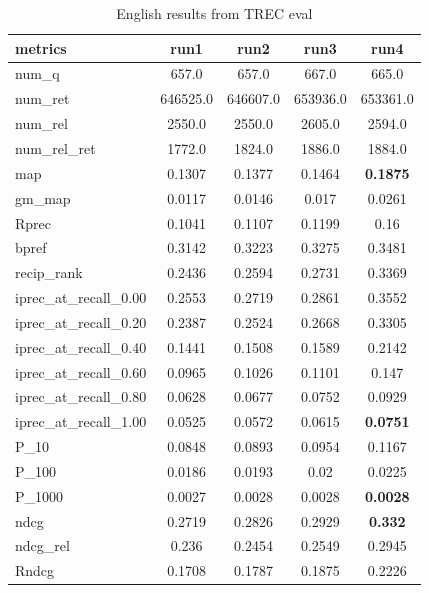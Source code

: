 
\begin{table}[h!]
    \centering
    \begin{tabular}{ |l|c|c|c|c| } 
        \hline
        metrics & run1 & run2 & run3 & run4 \\ \hline
        num\_q & 657.0 & 657.0 & 667.0 & 665.0 \\ \hline
        num\_ret & 646525.0 & 646607.0 & 653936.0 & 653361.0 \\ \hline
        num\_rel & 2550.0 & 2550.0 & 2605.0 & 2594.0 \\ \hline
        num\_rel\_ret & 1772.0 & 1824.0 & 1886.0 & 1884.0 \\ \hline
        map & 0.1307 & 0.1377 & 0.1464 & \textbf{0.1875} \\ \hline
        gm\_map & 0.0117 & 0.0146 & 0.017 & 0.0261 \\ \hline
        Rprec & 0.1041 & 0.1107 & 0.1199 & 0.16 \\ \hline
        bpref & 0.3142 & 0.3223 & 0.3275 & 0.3481 \\ \hline
        recip\_rank & 0.2436 & 0.2594 & 0.2731 & 0.3369 \\ \hline
        iprec\_at\_recall\_0.00 & 0.2553 & 0.2719 & 0.2861 & 0.3552 \\ \hline
        iprec\_at\_recall\_0.20 & 0.2387 & 0.2524 & 0.2668 & 0.3305 \\ \hline
        iprec\_at\_recall\_0.40 & 0.1441 & 0.1508 & 0.1589 & 0.2142 \\ \hline
        iprec\_at\_recall\_0.60 & 0.0965 & 0.1026 & 0.1101 & 0.147 \\ \hline
        iprec\_at\_recall\_0.80 & 0.0628 & 0.0677 & 0.0752 & 0.0929 \\ \hline
        iprec\_at\_recall\_1.00 & 0.0525 & 0.0572 & 0.0615 & \textbf{0.0751} \\ \hline
        P\_10 & 0.0848 & 0.0893 & 0.0954 & 0.1167 \\ \hline
        P\_100 & 0.0186 & 0.0193 & 0.02 & 0.0225 \\ \hline
        P\_1000 & 0.0027 & 0.0028 & 0.0028 & \textbf{0.0028} \\ \hline
        ndcg & 0.2719 & 0.2826 & 0.2929 & \textbf{0.332} \\ \hline
        ndcg\_rel & 0.236 & 0.2454 & 0.2549 & 0.2945 \\ \hline
        Rndcg & 0.1708 & 0.1787 & 0.1875 & 0.2226 \\ \hline
    \end{tabular}
    \caption{English results from TREC eval}
    \label{table:enlgish_r}
\end{table}





